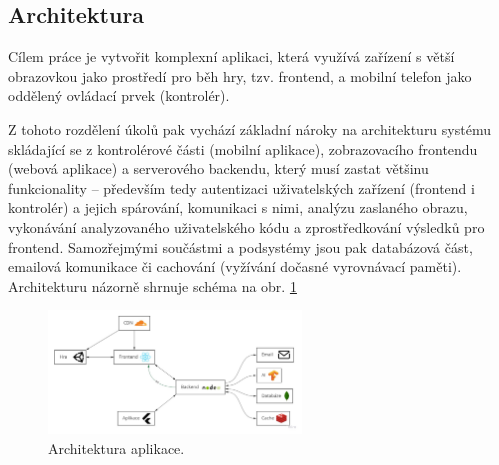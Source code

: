 \subsection{Architektura}

Cílem práce je vytvořit komplexní aplikaci, která využívá zařízení s větší obrazovkou jako prostředí pro běh hry, tzv. frontend, a mobilní telefon jako oddělený ovládací prvek (kontrolér). \par
Z tohoto rozdělení úkolů pak vychází základní nároky na architekturu systému skládající se z kontrolérové části (mobilní aplikace), zobrazovacího frontendu (webová aplikace) a serverového backendu, který musí zastat většinu funkcionality – především tedy autentizaci uživatelských zařízení (frontend i kontrolér) a jejich spárování, komunikaci s nimi, analýzu zaslaného obrazu, vykonávání analyzovaného uživatelského kódu a zprostředkování výsledků pro frontend. Samozřejmými součástmi a podsystémy jsou pak databázová část, emailová komunikace či cachování (vyžívání dočasné vyrovnávací paměti). Architekturu názorně shrnuje schéma na obr. \ref{fig:architektura}

\begin{figure}[h]
    \centering
    \includegraphics[width=0.6\textwidth]{img/architektura.jpg}
    \caption{Architektura aplikace.}
    \label{fig:architektura}
\end{figure}